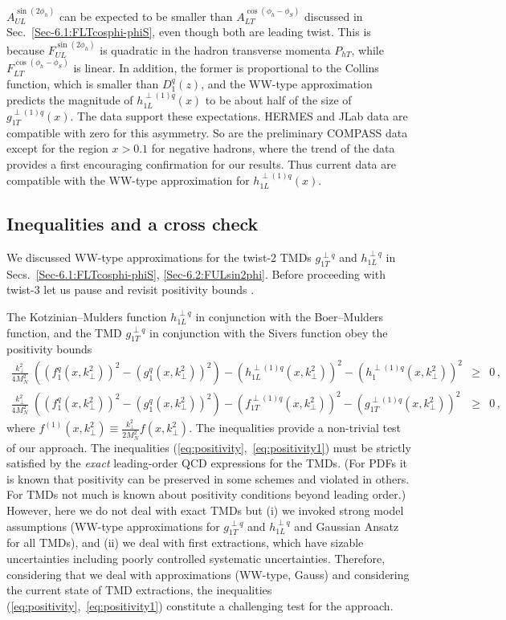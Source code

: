 \documentclass[a4paper,11pt]{article}
\newcommand{\ba}{\begin{eqnarray}}
\newcommand{\ea}{\end{eqnarray}}
\def\kperp{k_\perp}
\begin{document}
$A_{UL}^{\sin(2\phi_h)}$  can be expected to be smaller than
$A_{LT}^{\cos(\phi_h -\phi_S)}$ discussed in Sec.~\ref{Sec-6.1:FLTcosphi-phiS},
even though both are leading twist. This is because
$F_{UL}^{\sin(2\phi_h)}$ is quadratic in the hadron transverse
momenta $P_{hT}$, while $F_{LT}^{\cos(\phi_h -\phi_S)}$ is linear.
In addition, the former is proportional to the Collins function,
which is smaller than $D_1^q(z)$, and the WW-type approximation
predicts the magnitude of $h_{1L}^{\perp(1)q}(x)$ to be about half
of the size of $g_{1T}^{\perp(1)q}(x)$.
The data support these expectations. HERMES and JLab data are compatible
with zero for this asymmetry. So are the preliminary COMPASS data except
for the region
$x>0.1$ for negative hadrons, where the trend of the data provides a first
encouraging confirmation for our results. Thus current data are compatible
with the WW-type approximation for $h_{1L}^{\perp(1)q}(x)$.


\subsection{Inequalities and a cross check}

We discussed WW-type approximations for the twist-2 TMDs
$g^{\perp q}_{1T}$ and $h^{\perp q}_{1L}$
in Secs.~\ref{Sec-6.1:FLTcosphi-phiS}, \ref{Sec-6.2:FULsin2phi}.
Before proceeding with twist-3 let us pause and revisit positivity
bounds \cite{Bacchetta:1999kz}. 

The Kotzinian--Mulders function $h^{\perp q}_{1L}$ in conjunction with
the Boer--Mulders function, and the TMD $g^{\perp q}_{1T}$ in conjunction
with the Sivers function obey the positivity bounds
\cite{Bacchetta:1999kz}
\begin{subequations}\ba
	\frac{\kperp^2}{4M_N^2}\;
	\left((f_{1}^{q}(x,\kperp^2))^2 -(g_{1}^{q}(x,\kperp^2))^2\right)
	- (h^{\perp(1)q}_{1L}(x,\kperp^2))^2
	- (h_{1}^{\perp(1)q}(x,\kperp^2))^2
	& \ge & 0\,, \quad \label{eq:positivity}\\
	\frac{\kperp^2}{4M_N^2}\;
	\left((f_{1}^{q}(x,\kperp^2))^2 -(g_{1}^{q}(x,\kperp^2))^2\right)
	- (f_{1T}^{\perp(1)q}(x,\kperp^2))^2
	- (g^{\perp(1)q}_{1T}(x,\kperp^2))^2
	& \ge & 0\,, \quad \label{eq:positivity1}
\ea\end{subequations}
where $f^{(1)}(x,\kperp^2) \equiv \frac{\kperp^2}{2M_N^2} f(x,\kperp^2)$.
The inequalities provide a non-trivial test of our approach.
The inequalities (\ref{eq:positivity},~\ref{eq:positivity1})
must be strictly satisfied by the {\it exact} leading-order QCD
expressions for the TMDs.
(For PDFs it is known that positivity can be preserved in some
schemes and violated in others. For TMDs not much is
known about positivity conditions beyond leading order.)
However, here we do not deal with exact TMDs but (i) we invoked
strong model assumptions (WW-type approximations for $g^{\perp q}_{1T}$
and $h^{\perp q}_{1L}$ and Gaussian Ansatz for all TMDs), and (ii) we deal
with first extractions, which have sizable uncertainties including
poorly controlled systematic uncertainties.
Therefore, considering that we deal with approximations
(WW-type, Gauss) and considering the current state of TMD extractions,
the inequalities (\ref{eq:positivity},~\ref{eq:positivity1}) constitute
a challenging test for the approach.
\end{document}
